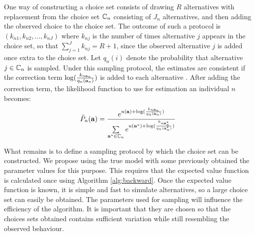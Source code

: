 One way of constructing a choice set consists of drawing $R$ alternatives with replacement from the choice set $\mathbb{C}_n$ consisting of $J_n$ alternatives, and then adding the observed choice to the choice set. The outcome of such a protocol is $({k}_{n1},{k}_{n2},\dots,{k}_{nJ})$ where ${k}_{nj}$ is the number of times alternative $j$ appears in the choice set, so that $\sum_{j=1}^J {k}_{nj} = R+1$, since the observed alternative $j$ is added once extra to the choice set. Let $q_n(i)$ denote the probability that alternative $j \in \mathbb{C}_n$ is sampled. Under this sampling protocol, the estimates are consistent if the correction term $\log(\frac{k_{n{\bf a}_n}}{q_n({\bf a}_n)})$ is added to each alternative \citep{frejinger2009}. After adding the correction term, the likelihood function to use for estimation an individual $n$ becomes:
\begin{equation} \label{eq:cond_like_corr}
\tilde{P}_n(\ve{a}) = \frac{e^{u(\ve{a}) + \log(\frac{k_{n\ve{a}_n}}{q_n(\ve{a}_n)})}}{\sum\limits_{\ve{a}^* \in \Cc_n} e^{u(\ve{a}^*) + \log(\frac{k_{n\ve{a}^*_n}}{q_n(\ve{a}^*_n)})}}
\end{equation}

What remains is to define a sampling protocol by which the choice set can be constructed. We propose using the true model with some previously obtained the parameter values for this purpose. This requires that the expected value function is calculated once using Algorithm \ref{alg:backward}. Once the expected value function is known, it is simple and fast to simulate alternatives, so a large choice set can easily be obtained. The parameters used for sampling will influence the efficiency of the algorithm. It is important that they are chosen so that the choices sets obtained contains sufficient variation while still resembling the observed behaviour. 

